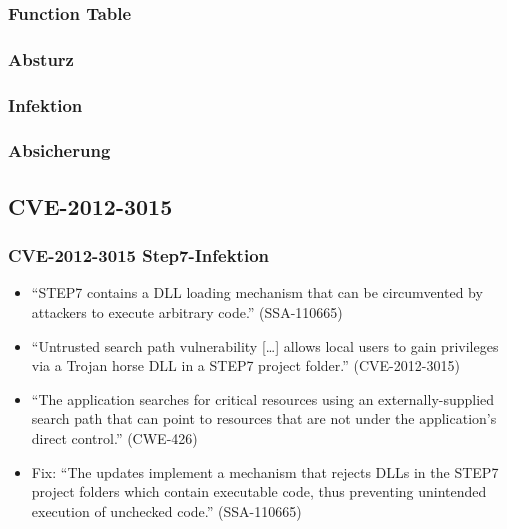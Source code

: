 \documentclass{beamer}
\begin{document}
\begin{frame}
  \frametitle{Function Table}
  
\end{frame}

\begin{frame}
  \frametitle{Absturz}
  
\end{frame}

\begin{frame}
  \frametitle{Infektion}
  
\end{frame}

\begin{frame}
  \frametitle{Absicherung}
  
\end{frame}

\subsection{CVE-2012-3015}

\begin{frame}
  \frametitle{CVE-2012-3015 Step7-Infektion}
  \begin{itemize}
    \item ``STEP7 contains a DLL loading mechanism that can be circumvented by attackers to execute arbitrary code.'' (SSA-110665)
    \item ``Untrusted search path vulnerability […] allows local users to gain privileges via a Trojan horse DLL in a STEP7 project folder.'' (CVE-2012-3015)
    \item ``The application searches for critical resources using an externally-supplied search path that can point to resources that are not under the application's direct control.'' (CWE-426)
    \item Fix: ``The updates implement a mechanism that rejects DLLs in the STEP7 project folders which contain executable code, thus preventing unintended execution of unchecked code.'' (SSA-110665)
  \end{itemize}
\end{frame}
\end{document}
